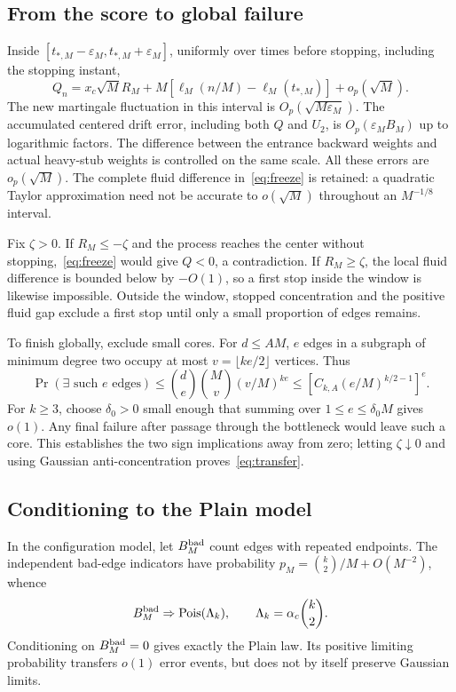 \documentclass[11pt,a4paper]{article}
\newcommand{\Pois}{\operatorname{Pois}}
\begin{document}
\subsection{From the score to global failure}
Inside $[t_{*,M}-\varepsilon_M,t_{*,M}+\varepsilon_M]$, uniformly over times before stopping, including the stopping instant,
\begin{equation}
Q_n=x_c\sqrt M R_M+M[\ell_M(n/M)-\ell_M(t_{*,M})]+o_p(\sqrt M).\label{eq:freeze}
\end{equation}
The new martingale fluctuation in this interval is $O_p(\sqrt{M\varepsilon_M})$. The accumulated centered drift error, including both $Q$ and $U_2$, is $O_p(\varepsilon_MB_M)$ up to logarithmic factors. The difference between the entrance backward weights and actual heavy-stub weights is controlled on the same scale. All these errors are $o_p(\sqrt M)$. The complete fluid difference in~\eqref{eq:freeze} is retained: a quadratic Taylor approximation need not be accurate to $o(\sqrt M)$ throughout an $M^{-1/8}$ interval.

Fix $\zeta>0$. If $R_M\le-\zeta$ and the process reaches the center without stopping,~\eqref{eq:freeze} would give $Q<0$, a contradiction. If $R_M\ge\zeta$, the local fluid difference is bounded below by $-O(1)$, so a first stop inside the window is likewise impossible. Outside the window, stopped concentration and the positive fluid gap exclude a first stop until only a small proportion of edges remains.

To finish globally, exclude small cores. For $d\le AM$, $e$ edges in a subgraph of minimum degree two occupy at most $v=\lfloor ke/2\rfloor$ vertices. Thus
\begin{equation}
\Pr(\exists\text{ such }e\text{ edges})
\le\binom de\binom Mv(v/M)^{ke}
\le[C_{k,A}(e/M)^{k/2-1}]^e.
\end{equation}
For $k\ge3$, choose $\delta_0>0$ small enough that summing over $1\le e\le\delta_0M$ gives $o(1)$. Any final failure after passage through the bottleneck would leave such a core. This establishes the two sign implications away from zero; letting $\zeta\downarrow0$ and using Gaussian anti-concentration proves~\eqref{eq:transfer}.

\subsection{Conditioning to the Plain model}
In the configuration model, let $B_M^{\rm bad}$ count edges with repeated endpoints. The independent bad-edge indicators have probability
$p_M=\binom{k}{2}/M+O(M^{-2})$, whence
\begin{equation}
B_M^{\rm bad}\Rightarrow\Pois(\Lambda_k),\qquad
\Lambda_k=\alpha_c\binom{k}{2}.
\end{equation}
Conditioning on $B_M^{\rm bad}=0$ gives exactly the Plain law. Its positive limiting probability transfers $o(1)$ error events, but does not by itself preserve Gaussian limits.
\end{document}
